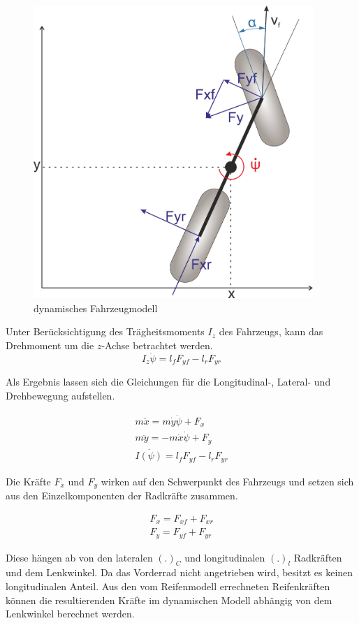 \documentclass{like}
\begin{document}
\begin{figure}[ht!]
	\centering
	\includegraphics[width=300pt]{Abbildungen/dynBicycle.png}
	\caption{dynamisches Fahrzeugmodell}
	\label{fig:dynModel}
\end{figure}

Unter Berücksichtigung des Trägheitsmoments \(I_z\) des Fahrzeugs, kann das Drehmoment um die \(z\)-Achse betrachtet werden.
\begin{equation}
I_z \ddot{\psi} = l_f F_{yf} - l_r F_{yr}
\end{equation}

Als Ergebnis lassen sich die Gleichungen für die Longitudinal-, Lateral- und Drehbewegung aufstellen.

\begin{eqnarray}
m \ddot{x} = m \dot{y} \dot{\psi} + F_x \\
m \ddot{y} = - m \dot{x} \dot{\psi} + F_y \\
I \ddot{(\psi)} = l_f F_{yf} - l_r F_{yr}
\end{eqnarray}

Die Kräfte \(F_{x}\) und \(F_{y}\) wirken auf den Schwerpunkt des Fahrzeugs und setzen sich aus den Einzelkomponenten der Radkräfte zusammen.

\begin{eqnarray}
F_x = F_{xf} + F_{xr} \\
F_y = F_{yf} + F_{yr}
\end{eqnarray}

Diese hängen ab von den lateralen \((.)_C\) und longitudinalen \((.)_l\)    Radkräften und dem Lenkwinkel. Da das Vorderrad nicht angetrieben wird, besitzt es keinen longitudinalen Anteil. Aus den vom Reifenmodell errechneten Reifenkräften können die resultierenden Kräfte im dynamischen Modell abhängig von dem Lenkwinkel berechnet werden.
\end{document}

